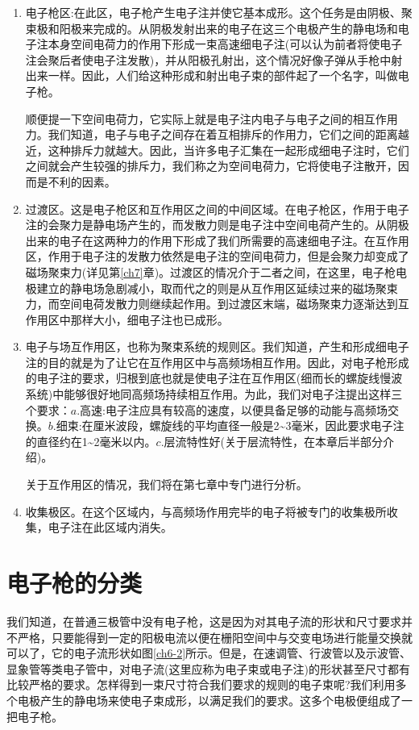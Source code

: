 \begin{enumerate}
	\item 电子枪区:在此区，电子枪产生电子注并使它基本成形。这个任务是由阴极、聚束极和阳极来完成的。从阴极发射出来的电子在这三个电极产生的静电场和电子注本身空间电荷力的作用下形成一束高速细电子注(可以认为前者将使电子注会聚后者使电子注发散)，并从阳极孔射出，这个情况好像子弹从手枪中射出来一样。因此，人们给这种形成和射出电子束的部件起了一个名字，叫做电子枪。	
	
	顺便提一下空间电荷力，它实际上就是电子注内电子与电子之间的相互作用力。我们知道，电子与电子之间存在着互相排斥的作用力，它们之间的距离越近，这种排斥力就越大。因此，当许多电子汇集在一起形成细电子注时，它们之间就会产生较强的排斥力，我们称之为空间电荷力，它将使电子注散开，因而是不利的因素。
	\item 过渡区。这是电子枪区和互作用区之间的中间区域。在电子枪区，作用于电子注的会聚力是静电场产生的，而发散力则是电子注中空间电荷产生的。从阴极出来的电子在这两种力的作用下形成了我们所需要的高速细电子注。在互作用区，作用于电子注的发散力依然是电子注的空间电荷力，但是会聚力却变成了磁场聚束力(详见第\ref{ch7}章)。过渡区的情况介于二者之间，在这里，电子枪电极建立的静电场急剧减小，取而代之的则是从互作用区延续过来的磁场聚束力，而空间电荷发散力则继续起作用。到过渡区末端，磁场聚束力逐渐达到互作用区中那样大小，细电子注也已成形。
	\item 电子与场互作用区，也称为聚束系统的规则区。我们知道，产生和形成细电子注的目的就是为了让它在互作用区中与高频场相互作用。因此，对电子枪形成的电子注的要求，归根到底也就是使电子注在互作用区(细而长的螺旋线慢波系统)中能够很好地同高频场持续相互作用。为此，我们对电子注提出这样三个要求：$ a .$高速:电子注应具有较高的速度，以便具备足够的动能与高频场交换。$ b. $细束:在厘米波段，螺旋线的平均直径一般是2\textasciitilde3毫米，因此要求电子注的直径约在1\textasciitilde2毫米以内。$ c. $层流特性好(关于层流特性，在本章后半部分介绍)。
	
	关于互作用区的情况，我们将在第七章中专门进行分析。
	\item 收集极区。在这个区域内，与高频场作用完毕的电子将被专门的收集极所收集，电子注在此区域内消失。
\end{enumerate}


\section{电子枪的分类}

我们知道，在普通三极管中没有电子枪，这是因为对其电子流的形状和尺寸要求并不严格，只要能得到一定的阳极电流以便在栅阳空间中与交变电场进行能量交换就可以了，它的电子流形状如图\ref{ch6-2}所示。但是，在速调管、行波管以及示波管、显象管等类电子管中，对电子流(这里应称为电子束或电子注)的形状甚至尺寸都有比较严格的要求。怎样得到一束尺寸符合我们要求的规则的电子束呢?我们利用多个电极产生的静电场来使电子束成形，以满足我们的要求。这多个电极便组成了一把电子枪。


